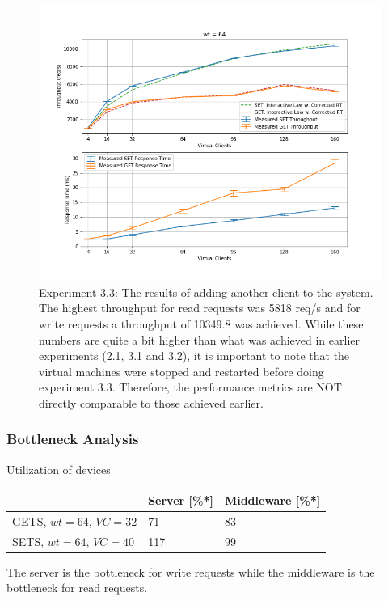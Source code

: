 \documentclass[11pt,a4paper]{article}
\begin{document}
\begin{figure}
\centering
\includegraphics[width=.9\textwidth]{33/33_max_config}
\caption{Experiment 3.3: The results of adding another client to the system. The highest throughput for read requests was 5818 req/s and for write requests a throughput of 10349.8 was achieved. While these numbers are quite a bit higher than what was achieved in earlier experiments (2.1, 3.1 and 3.2), it is important to note that the virtual machines were stopped and restarted before doing experiment 3.3. Therefore, the performance metrics are NOT directly comparable to those achieved earlier.}
\label{fig:33_max_config}
\end{figure}

\subsubsection{Bottleneck Analysis}
\begin{center}
	{Utilization of devices\\}
	\begin{tabular}{|l|p{3cm}|p{3cm}|}
		\hline        & Server  [\%*]                 & Middleware [\%*]                             \\ 
		\hline GETS,  $wt=64$, $VC=32$     &    71       &       83         \\ 
		\hline SETS,  $wt=64$, $VC=40$     &    117      &       99        \\ 
		\hline 
	\end{tabular}
\end{center}
The server is the bottleneck for write requests while the middleware is the bottleneck for read requests.\\
\end{document}
